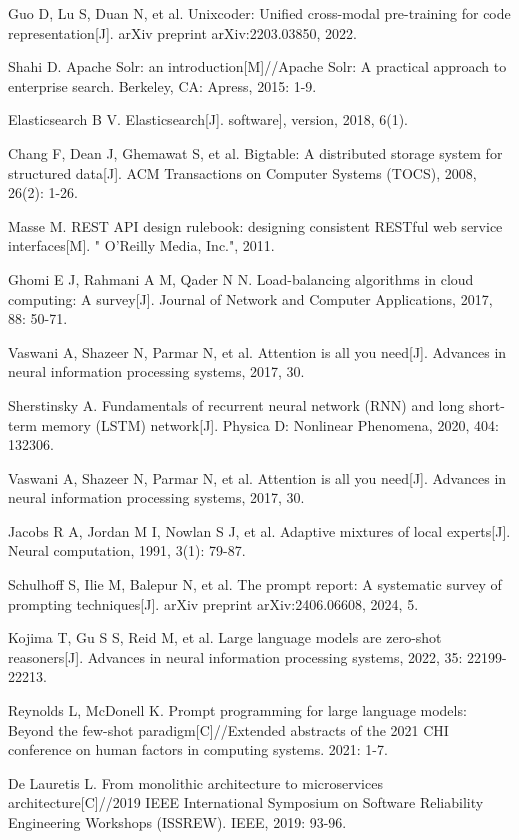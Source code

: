 \documentclass[UTF8,a4paper,12pt]{ctexart}
\numberwithin{equation}{section}
\begin{document}
\begin{thebibliography}{1}
 Guo D, Lu S, Duan N, et al. Unixcoder: Unified cross-modal pre-training for code representation[J]. arXiv preprint arXiv:2203.03850, 2022.

 Shahi D. Apache Solr: an introduction[M]//Apache Solr: A practical approach to enterprise search. Berkeley, CA: Apress, 2015: 1-9.

 Elasticsearch B V. Elasticsearch[J]. software], version, 2018, 6(1).

 Chang F, Dean J, Ghemawat S, et al. Bigtable: A distributed storage system for structured data[J]. ACM Transactions on Computer Systems (TOCS), 2008, 26(2): 1-26.

 Masse M. REST API design rulebook: designing consistent RESTful web service interfaces[M]. " O'Reilly Media, Inc.", 2011.

 Ghomi E J, Rahmani A M, Qader N N. Load-balancing algorithms in cloud computing: A survey[J]. Journal of Network and Computer Applications, 2017, 88: 50-71.

 Vaswani A, Shazeer N, Parmar N, et al. Attention is all you need[J]. Advances in neural information processing systems, 2017, 30.

 Sherstinsky A. Fundamentals of recurrent neural network (RNN) and long short-term memory (LSTM) network[J]. Physica D: Nonlinear Phenomena, 2020, 404: 132306.

 Vaswani A, Shazeer N, Parmar N, et al. Attention is all you need[J]. Advances in neural information processing systems, 2017, 30.


 Jacobs R A, Jordan M I, Nowlan S J, et al. Adaptive mixtures of local experts[J]. Neural computation, 1991, 3(1): 79-87.

  Schulhoff S, Ilie M, Balepur N, et al. The prompt report: A systematic survey of prompting techniques[J]. arXiv preprint arXiv:2406.06608, 2024, 5.

 Kojima T, Gu S S, Reid M, et al. Large language models are zero-shot reasoners[J]. Advances in neural information processing systems, 2022, 35: 22199-22213.

 Reynolds L, McDonell K. Prompt programming for large language models: Beyond the few-shot paradigm[C]//Extended abstracts of the 2021 CHI conference on human factors in computing systems. 2021: 1-7.

  De Lauretis L. From monolithic architecture to microservices architecture[C]//2019 IEEE International Symposium on Software Reliability Engineering Workshops (ISSREW). IEEE, 2019: 93-96.



\end{thebibliography}
\end{document}
